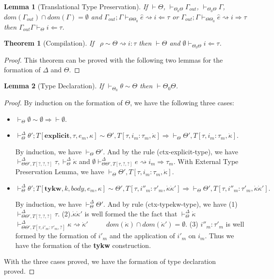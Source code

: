 \documentclass{sig-alternate}
\newcommand{\myvdash}{\vdash_{\Theta}^{\Delta}}
\newtheorem{theorem}{Theorem}
\newtheorem{lemma}{Lemma}
\begin{document}
\begin{lemma}[Translational Type Preservation]
If $\vdash\Theta$, $\vdash_{\Theta_0\Theta}\Gamma_{out}$, $\vdash_{\Theta_0\Theta}\Gamma$, $dom(\Gamma_{out})\cap dom(\Gamma)=\emptyset$ and $\Gamma_{out};\Gamma\vdash_{\Theta\Theta_0}\hat{e}\rightsquigarrow i\Leftarrow\tau$ or $\Gamma_{out};\Gamma\vdash_{\Theta\Theta_0}\hat{e}\rightsquigarrow i\Rightarrow \tau$ then $\Gamma_{out}\Gamma\vdash_{\Theta}i\Leftarrow \tau$.
\end{lemma}

\begin{theorem}[Compilation]
If ~$\rho\sim\Theta\rightsquigarrow i:\tau$ then $\vdash\Theta$ and $\emptyset\vdash_{\Theta_0\Theta} i\Leftarrow\tau$.
\end{theorem}
\begin{proof}
This theorem can be proved with the following two lemmas for the formation of $\Delta$ and $\Theta$.
\end{proof}

\begin{lemma}[Type Declaration]
If $\vdash_{\Theta_0}\theta\sim\Theta$ then $\vdash\Theta_0\Theta$.
\end{lemma}
\begin{proof}
By induction on the formation of $\Theta$, we have the following three cases:
\begin{itemize}
\item $\vdash_{\Theta}\emptyset\sim\emptyset \Longrightarrow \vdash{\emptyset}$.
\item ${\vdash^{\Delta}_{\Theta}} \theta';T[\mathbf{explicit},\tau,e_m,\kappa] \sim \Theta',T[\tau,i_m:\tau_m,\dot\kappa] \Longrightarrow \vdash_{\Theta}\Theta',T[\tau,i_m:\tau_m,\dot{\kappa}]$. 

By induction, we have $\vdash_{\Theta}\Theta'$. And by the rule (ctx-explicit-type), we have $\vdash_{\Theta\Theta',T[?,?,?]}^{\Delta}\tau, \myvdash\dot\kappa$ and $\emptyset\vdash_{\Theta\Theta',T[\tau,?,?]}^{\Delta}e\rightsquigarrow i_m\Rightarrow\tau_m$. With External Type Preservation Lemma, we have $\vdash_{\Theta}\Theta',T[\tau,i_m:\tau_m,\dot{\kappa}]$.
\item $\myvdash \theta';T[\mathbf{tykw},k,body,e_m,\kappa] \sim \Theta',T[\tau,i''_m:\tau'_m,\dot{\kappa}\dot{\kappa}'] \Longrightarrow \vdash_{\Theta}\Theta',T[\tau,i''_m:\tau'_m,\dot{\kappa}\dot{\kappa}'].$

By induction, we have $\myvdash\Theta'$. And by rule (ctx-typekw-type), we have (1) $\vdash_{\Theta\Theta',T[?,?,?]}^{\Delta}\tau$. (2).$\dot\kappa\dot\kappa'$ is well formed the the fact that $\myvdash \dot\kappa$~~~~ $\vdash^{\Delta}_{\Theta\Theta',T[\tau,i'_m:\tau'_m,?]}\kappa\rightsquigarrow\dot{\kappa}'$ ~~~~ $dom(\dot{\kappa})\cap dom(\dot{\kappa}')=\emptyset$. (3) $i''_m:\tau'_m$ is well formed by the formation of $i'_m$ and the application of $i'_m$ on $i_m$. Thus we have the formation of the \textbf{tykw} construction.
\end{itemize}
With the three cases proved, we have the formation of type declaration proved.
\end{proof}
\end{document}
